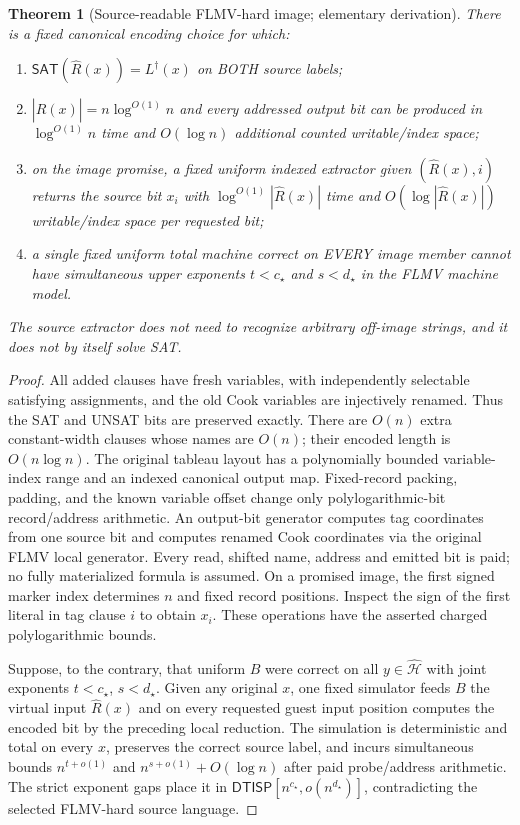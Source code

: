 \documentclass[11pt]{article}
\newtheorem{theorem}{Theorem}
\newcommand{\SAT}{\mathsf{SAT}}
\newcommand{\DTISP}{\mathsf{DTISP}}
\begin{document}
\begin{theorem}[Source-readable FLMV-hard image; elementary derivation]
There is a fixed canonical encoding choice for which:
\begin{enumerate}
\item $\SAT(\widehat R(x))=L^\dagger(x)$ on BOTH source labels;
\item $|\widehat R(x)|=n\log^{O(1)}n$ and every addressed
output bit can be produced in $\log^{O(1)}n$ time and
$O(\log n)$ additional counted writable/index space;
\item on the image promise, a fixed uniform indexed extractor
given $(\widehat R(x),i)$ returns the source bit $x_i$ with
$\log^{O(1)}|\widehat R(x)|$ time and $O(\log|\widehat R(x)|)$
writable/index space per requested bit;
\item a single fixed uniform total machine correct on
EVERY image member cannot have simultaneous upper exponents
$t<c_\star$ and $s<d_\star$ in the FLMV machine model.
\end{enumerate}
The source extractor does not need to recognize arbitrary off-image
strings, and it does not by itself solve SAT.
\end{theorem}
\begin{proof}
All added clauses have fresh variables, with independently selectable
satisfying assignments, and the old Cook variables are injectively
renamed. Thus the SAT and UNSAT bits are preserved exactly.
There are $O(n)$ extra constant-width clauses whose names are
$O(n)$; their encoded length is $O(n\log n)$.
The original tableau layout has a polynomially bounded
variable-index range and an indexed canonical output map.
Fixed-record packing, padding, and the known variable offset
change only polylogarithmic-bit record/address arithmetic.
An output-bit generator computes tag coordinates from one source
bit and computes renamed Cook coordinates via the original FLMV
local generator. Every read, shifted name, address and emitted
bit is paid; no fully materialized formula is assumed.
On a promised image, the first signed marker index determines
$n$ and fixed record positions. Inspect the sign of the first
literal in tag clause $i$ to obtain $x_i$. These operations have
the asserted charged polylogarithmic bounds.

Suppose, to the contrary, that uniform $B$ were correct on all
$y\in\widehat{\mathcal H}$ with joint exponents $t<c_\star$,
$s<d_\star$. Given any original $x$, one fixed simulator feeds
$B$ the virtual input $\widehat R(x)$ and on every requested guest
input position computes the encoded bit by the preceding local
reduction. The simulation is deterministic and total on every $x$,
preserves the correct source label, and incurs simultaneous bounds
$n^{t+o(1)}$ and $n^{s+o(1)}+O(\log n)$ after paid
probe/address arithmetic. The strict exponent gaps place it in
$\DTISP[n^{c_\star},o(n^{d_\star})]$, contradicting the
selected FLMV-hard source language.
\end{proof}
\end{document}
